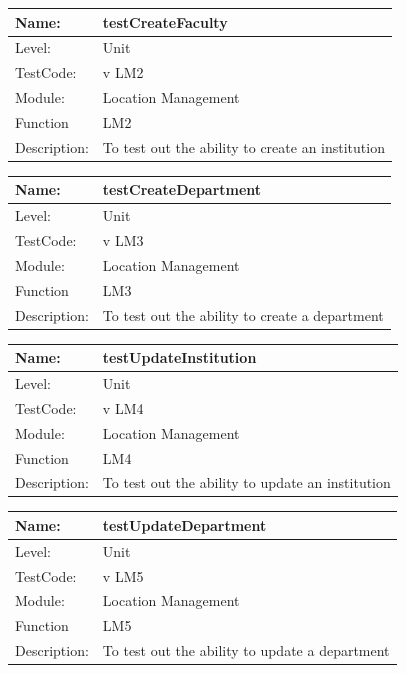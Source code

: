 \documentclass[12pt]{article}
\begin{document}
\begin{center}
\begin{tabular}{|l|p{12cm}|}
\hline

 Name: & testCreateFaculty\\ 
 \hline
Level: & Unit \\
\hline
TestCode: & v LM2 \\
\hline
Module:& Location Management \\
\hline
Function & LM2 \\
\hline
Description: & To test out the ability to create an institution  \\
\hline
\end{tabular}
\end{center}

\begin{center}
\begin{tabular}{|l|p{12cm}|}
\hline

 Name: & testCreateDepartment\\
 \hline
Level: & Unit \\
\hline
TestCode: & v LM3 \\
\hline
Module:& Location Management \\
\hline
Function & LM3 \\
\hline
Description: & To test out the ability to create a department  \\
\hline
\end{tabular}
\end{center}

\begin{center}
\begin{tabular}{|l|p{12cm}|}
\hline

 Name: & testUpdateInstitution\\
 \hline
Level: & Unit \\
\hline
TestCode: & v LM4 \\
\hline
Module:& Location Management \\
\hline
Function & LM4 \\
\hline
Description: & To test out the ability to update an institution  \\
\hline
\end{tabular}
\end{center}

\begin{center}
\begin{tabular}{|l|p{12cm}|}
\hline

 Name: & testUpdateDepartment \\
 \hline
Level: & Unit \\
\hline
TestCode: & v LM5 \\
\hline
Module:& Location Management \\
\hline
Function & LM5 \\
\hline
Description: & To test out the ability to update a department  \\
\hline
\end{tabular}
\end{center}
\end{document}
